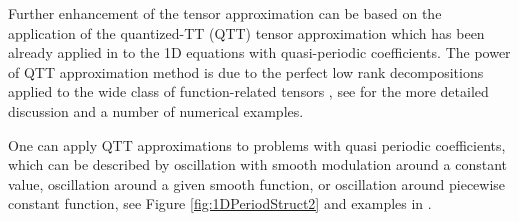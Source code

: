 \documentclass[amstex,amstext,amsfonts,epsf,12pt] {amsart}
\newcommand{\cred}{\color{red}}
\newcommand{\cn}{\color{black}}
\begin{document}
Further enhancement of the tensor approximation can be based on the application 
of the quantized-TT (QTT) tensor approximation which has been already applied in \cite{BokhSRep:15}
to the 1D equations with quasi-periodic coefficients. 
The power of QTT approximation method is due to the
perfect low rank decompositions applied to the wide class of function-related 
tensors \cite{KhQuant:09}, see \cite{BokhSRep:15} for the more detailed discussion
and a number of numerical examples. 


One can apply QTT approximations to problems with
quasi periodic coefficients, which can be described by 
oscillation with smooth modulation around a constant value, oscillation around 
a given smooth function, or oscillation around piecewise constant function, see Figure 
\ref{fig:1DPeriodStruct2} and examples in \cite{BokhSRep:15}.
\end{document}
